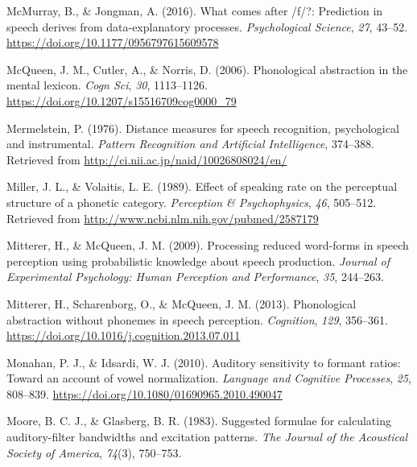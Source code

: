 \documentclass[
  11pt,
  english,
  man,floatsintext]{apa6}
\newlength{\cslhangindent}
\newlength{\cslentryspacingunit} %
\newenvironment{CSLReferences}[2] %
 {%
  \setlength{\parindent}{0pt}
  \ifodd #1
  \let\oldpar\par
  \def\par{\hangindent=\cslhangindent\oldpar}
  \fi
  \setlength{\parskip}{#2\cslentryspacingunit}
 }%
 {}
\begin{document}
\begin{CSLReferences}{1}{0}
\leavevmode{}%
McMurray, B., \& Jongman, A. (2016). What comes after /f/?: Prediction in speech derives from data-explanatory processes. \emph{Psychological Science}, \emph{27}, 43--52. \url{https://doi.org/10.1177/0956797615609578}

\leavevmode{}%
McQueen, J. M., Cutler, A., \& Norris, D. (2006). Phonological abstraction in the mental lexicon. \emph{Cogn Sci}, \emph{30}, 1113--1126. \url{https://doi.org/10.1207/s15516709cog0000_79}

\leavevmode{}%
Mermelstein, P. (1976). Distance measures for speech recognition, psychological and instrumental. \emph{Pattern Recognition and Artificial Intelligence}, 374--388. Retrieved from \url{http://ci.nii.ac.jp/naid/10026808024/en/}

\leavevmode{}%
Miller, J. L., \& Volaitis, L. E. (1989). Effect of speaking rate on the perceptual structure of a phonetic category. \emph{Perception \& Psychophysics}, \emph{46}, 505--512. Retrieved from \url{http://www.ncbi.nlm.nih.gov/pubmed/2587179}

\leavevmode{}%
Mitterer, H., \& McQueen, J. M. (2009). Processing reduced word-forms in speech perception using probabilistic knowledge about speech production. \emph{Journal of Experimental Psychology: Human Perception and Performance}, \emph{35}, 244--263.

\leavevmode{}%
Mitterer, H., Scharenborg, O., \& McQueen, J. M. (2013). Phonological abstraction without phonemes in speech perception. \emph{Cognition}, \emph{129}, 356--361. \url{https://doi.org/10.1016/j.cognition.2013.07.011}

\leavevmode{}%
Monahan, P. J., \& Idsardi, W. J. (2010). Auditory sensitivity to formant ratios: Toward an account of vowel normalization. \emph{Language and Cognitive Processes}, \emph{25}, 808--839. \url{https://doi.org/10.1080/01690965.2010.490047}

\leavevmode{}%
Moore, B. C. J., \& Glasberg, B. R. (1983). Suggested formulae for calculating auditory-filter bandwidths and excitation patterns. \emph{The Journal of the Acoustical Society of America}, \emph{74}(3), 750--753.


\end{CSLReferences}
\end{document}
